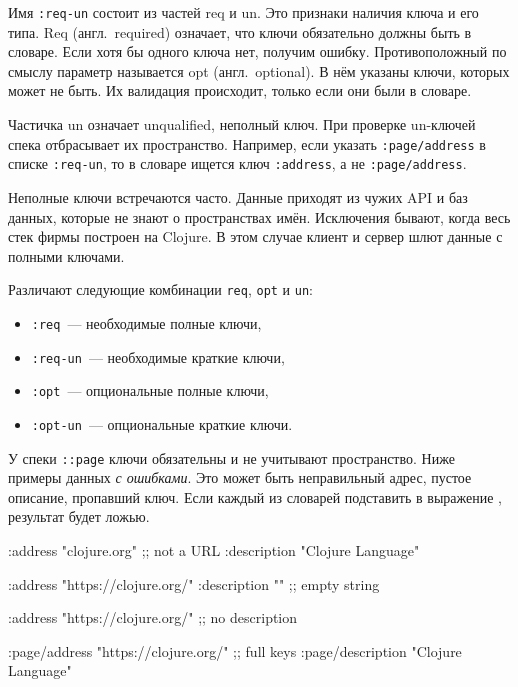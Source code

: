 Имя \verb|:req-un| состоит из частей req и un. Это признаки наличия
ключа и его типа. Req (англ.~required) означает, что ключи обязательно должны
быть в словаре. Если хотя бы одного ключа нет, получим ошибку. Противоположный
по смыслу параметр называется opt (англ.~optional). В нём указаны ключи,
которых может не быть. Их валидация происходит, только если они были в словаре.


Частичка un означает unqualified, неполный ключ. При проверке un-ключей
спека отбрасывает их пространство. Например, если указать \verb|:page/address|
в списке \verb|:req-un|, то в словаре ищется ключ \verb|:address|, а не
\verb|:page/address|.

Неполные ключи встречаются часто. Данные приходят из чужих API и баз данных,
которые не знают о пространствах имён. Исключения бывают, когда весь стек фирмы
построен на Clojure. В этом случае клиент и сервер шлют данные с полными
ключами.

Различают следующие комбинации \verb|req|, \verb|opt| и \verb|un|:

\begin{itemize}

\item
  \verb|:req|~--- необходимые полные ключи,

\item
  \verb|:req-un|~--- необходимые краткие ключи,


\item
  \verb|:opt|~--- опциональные полные ключи,


\item
  \verb|:opt-un|~--- опциональные краткие ключи.

\end{itemize}

У спеки \verb|::page| ключи обязательны и не учитывают пространство. Ниже
примеры данных \emph{с ошибками}. Это может быть неправильный адрес, пустое
описание, пропавший ключ. Если каждый из словарей подставить в выражение
, результат будет ложью.

\begin{english}
  \begin{clojure}
{:address "clojure.org" ;; not a URL
 :description "Clojure Language"}

{:address "https://clojure.org/"
 :description ""} ;; empty string

{:address "https://clojure.org/"} ;; no description

{:page/address "https://clojure.org/" ;; full keys
 :page/description "Clojure Language"}
  \end{clojure}
\end{english}

